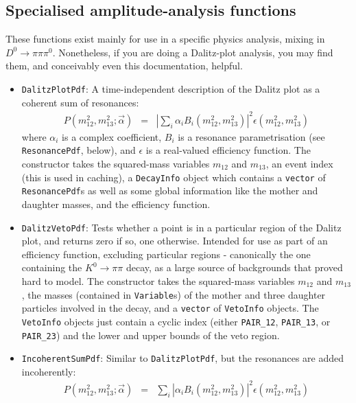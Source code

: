 \documentclass[12pt,pdflatex]{article}
\begin{document}
\subsection{Specialised amplitude-analysis functions}

These functions exist mainly for use in a specific
physics analysis, mixing in $D^0\to\pi\pi\pi^0$. Nonetheless, 
if you are doing a Dalitz-plot analysis, you may find them, and
conceivably even this documentation, helpful. 

\begin{itemize}
\item \texttt{DalitzPlotPdf}: A time-independent description
of the Dalitz plot as a coherent sum of resonances:
\begin{eqnarray}
P(m^2_{12},m^2_{13};\vec\alpha) &=& \left|\sum\limits_i \alpha_i B_i(m^2_{12},m^2_{13})\right|^2\epsilon(m^2_{12},m^2_{13})
\end{eqnarray}
where $\alpha_i$ is a complex coefficient, $B_i$ is a resonance parametrisation (see \texttt{ResonancePdf}, below),
and $\epsilon$ is a real-valued efficiency function. The constructor takes the squared-mass variables $m_{12}$ and
$m_{13}$, an event index (this is used in caching), a \texttt{DecayInfo} object which contains a \texttt{vector}
of \texttt{ResonancePdf}s as well as some global information like the mother and daughter masses, 
and the efficiency function. 
\item \texttt{DalitzVetoPdf}: Tests whether a point is in a particular 
region of the Dalitz plot, and returns zero if so, one otherwise. Intended for
use as part of an efficiency function, excluding particular regions - canonically
the one containing the  $K^0\to\pi\pi$ decay, as a large source of backgrounds that
proved hard to model. The constructor takes the squared-mass variables $m_{12}$ and
$m_{13}$, the masses (contained in \texttt{Variable}s) of the mother and three daughter
particles involved in the decay, and a \texttt{vector} of \texttt{VetoInfo} objects.
The \texttt{VetoInfo} objects just contain a cyclic index (either \texttt{PAIR\_12},
\texttt{PAIR\_13}, or \texttt{PAIR\_23}) and the lower and upper bounds of the veto region.
\item \texttt{IncoherentSumPdf}: Similar to \texttt{DalitzPlotPdf}, 
but the resonances are added incoherently:
\begin{eqnarray}
P(m^2_{12},m^2_{13};\vec\alpha) &=& \sum\limits_i \left|\alpha_i B_i(m^2_{12},m^2_{13})\right|^2\epsilon(m^2_{12},m^2_{13})
\end{eqnarray}

\end{itemize}
\end{document}
